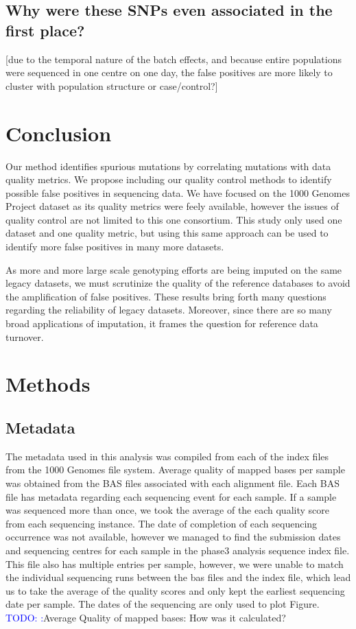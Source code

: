 \documentclass[12pt]{amsart}
\newcommand{\todo}[1]{\textcolor{blue}{TODO: #1}}
\begin{document}
{\subsection{Why were these SNPs even associated in the first place?}
[due to the temporal nature of the batch effects, and because entire populations were sequenced in one centre on one day, the false positives are more likely to cluster with population structure or case/control?]

			\section{Conclusion}
Our method identifies spurious mutations by correlating mutations with data quality metrics. 
We propose including our quality control methods to identify possible false positives in sequencing data. 
We have focused on the 1000 Genomes Project dataset as its quality metrics were feely available, however the issues of quality control are not limited to this one consortium. 
This study only used one dataset and one quality metric, but using this same approach can be used to identify more false positives in many more datasets. 

As more and more large scale genotyping efforts are being imputed on the same legacy datasets, we must scrutinize the quality of the reference databases to avoid the amplification of false positives. 
These results bring forth many questions regarding the reliability of legacy datasets. 
Moreover, since there are so many broad applications of imputation, it frames the question for reference data turnover. 



\section{Methods}
\subsection{Metadata}
The metadata used in this analysis was compiled from each of the index files from the 1000 Genomes file system. 
Average quality of mapped bases per sample was obtained from the BAS files associated with each alignment file. 
Each BAS file has metadata regarding each sequencing event for each sample. 
If a sample was sequenced more than once, we took the average of the each quality score from each sequencing instance. 
The date of completion of each sequencing occurrence was not available, however we managed to find the submission dates and sequencing centres for each sample in the phase3 analysis sequence index file.  
This file also has multiple entries per sample, however, we were unable to match the individual sequencing runs between the bas files and the index file, which lead us to take the average of the quality scores and only kept the earliest sequencing date per sample. 
The dates of the sequencing are only used to plot Figure. \todo:{Average Quality of mapped bases: How was it calculated?}

}
\end{document}
